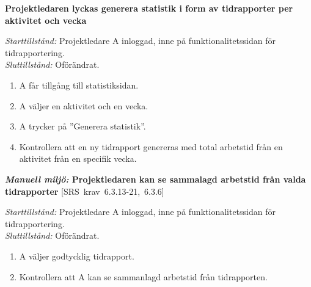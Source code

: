 \documentclass[a4paper]{article}
\def\reqinside{\hfil\penalty 100 \hfilneg \hbox}
\def \req [#1]{\reqinside{[SRS krav #1]}}
\begin{document}
\begin{FT}
\item
\textbf{Projektledaren lyckas generera statistik i form av tidrapporter per aktivitet och vecka}

\emph{Starttillstånd:} Projektledare A inloggad, inne på funktionalitetssidan för tidrapportering.\\
\emph{Sluttillstånd:} Oförändrat.

\begin{enumerate}
\item A får tillgång till statistiksidan.
\item A väljer en aktivitet och en vecka.
\item A trycker på ''Generera statistik''.
\item Kontrollera att en ny tidrapport genereras med total arbetstid från en aktivitet från en specifik vecka.
\end{enumerate}


\item
\textbf{\emph{Manuell miljö:} Projektledaren kan se sammalagd arbetstid från valda tidrapporter} \req[6.3.13-21, 6.3.6]

\emph{Starttillstånd:} Projektledare A inloggad, inne på funktionalitetssidan för tidrapportering.\\
\emph{Sluttillstånd:} Oförändrat.

\begin{enumerate}
\item A väljer godtycklig tidrapport.
\item Kontrollera att A kan se sammanlagd arbetstid från tidrapporten.
\end{enumerate}






\end{FT}
\end{document}
